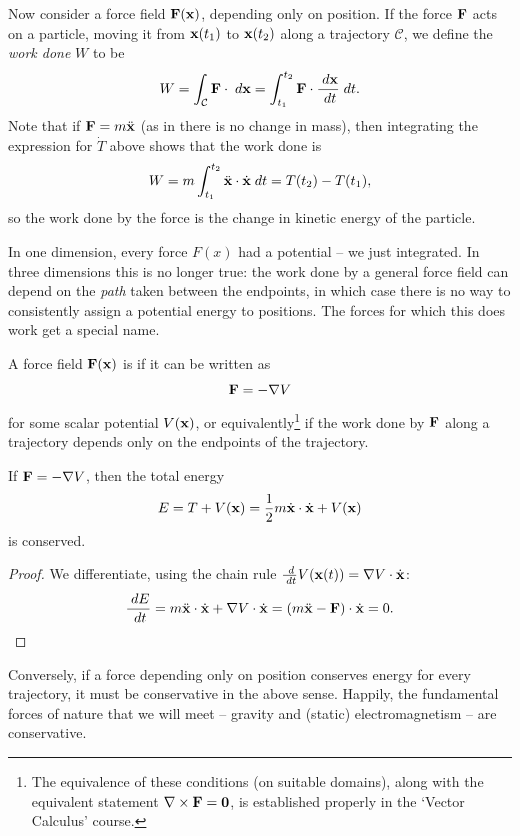 \documentclass[a4paper]{scrartcl}
\begin{document}
Now consider a force field $\mathbf{F}(\mathbf{x})$, depending only on position.  If the force $\mathbf{F}$ acts on a particle, moving it from $\mathbf{x}(t_1)$ to $\mathbf{x}(t_2)$ along a trajectory $\mathcal{C}$, we define the \emph{work done} $W$ to be
$$
W = \int_\mathcal{C} \mathbf{F} \cdot \; d \mathbf{x} = \int_{t_1}^{t_2} \mathbf{F} \cdot \frac{\; d \mathbf{x}}{\; d t} \; d t.
$$
Note that if $\mathbf{F} = m \ddot{\mathbf{x}}$ (as in there is no change in mass), then integrating the expression for $\dot T$ above shows that the work done is
$$
W = m \int_{t_1}^{t_2} \ddot{\mathbf{x}} \cdot \dot{\mathbf{x}} \; d t = T(t_2) - T(t_1),
$$
so the work done by the force is the change in kinetic energy of the particle.

In one dimension, every force $F(x)$ had a potential -- we just integrated. In three dimensions this is no longer true: the work done by a general force field can depend on the \emph{path} taken between the endpoints, in which case there is no way to consistently assign a potential energy to positions. The forces for which this does work get a special name.

\begin{definition}
	A force field $\mathbf{F}(\mathbf{x})$ is  if it can be written as
	$$
	\mathbf{F} = -\nabla V
	$$
	for some scalar potential $V(\mathbf{x})$, or equivalently\footnote{The equivalence of these conditions (on suitable domains), along with the equivalent statement $\nabla \times \mathbf{F} = \mathbf{0}$, is established properly in the `Vector Calculus' course.} if the work done by $\mathbf{F}$ along a trajectory depends only on the endpoints of the trajectory.
\end{definition}

\begin{proposition}
	If $\mathbf{F} = -\nabla V$, then the total energy
	$$
	E = T + V(\mathbf{x}) = \frac{1}{2}m \dot{\mathbf{x}} \cdot \dot{\mathbf{x}} + V(\mathbf{x})
	$$
	is conserved.
\end{proposition}
\begin{proof}
	We differentiate, using the chain rule $\frac{\; d}{\; d t}V(\mathbf{x}(t)) = \nabla V \cdot \dot{\mathbf{x}}$:
	\[
	\frac{\; d E}{\; d t} = m \ddot{\mathbf{x}}\cdot \dot{\mathbf{x}} + \nabla V \cdot \dot{\mathbf{x}} = \left(m \ddot{\mathbf{x}} - \mathbf{F}\right)\cdot \dot{\mathbf{x}} = 0. \qedhere
	\]
\end{proof}

Conversely, if a force depending only on position conserves energy for every trajectory, it must be conservative in the above sense. Happily, the fundamental forces of nature that we will meet -- gravity and (static) electromagnetism -- are conservative.
\end{document}
